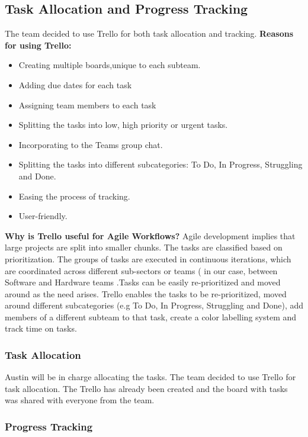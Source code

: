 \documentclass{article}
\begin{document}
\subsection{Task Allocation and Progress Tracking}
The team decided to use Trello for both task allocation and tracking. 
\newline 
\textbf{Reasons for using Trello:}
\begin{itemize}
\item Creating multiple boards,unique to each subteam.
\item Adding due dates for each task
\item Assigning team members to each task
\item Splitting the tasks into low, high priority or urgent tasks.
\item Incorporating to the Teams group chat. 
\item Splitting the tasks into different subcategories: To Do, In Progress, Struggling and Done. 
\item Easing the process of tracking.
\item User-friendly. 
\end{itemize}
\textbf{Why is Trello useful for Agile Workflows? }
\newline
\newline
Agile development implies  that large projects are split into smaller chunks. The tasks are classified based on prioritization. The groups of tasks are executed in continuous iterations, which are coordinated across different sub-sectors or teams ( in our case, between Software and Hardware teams .Tasks can be easily re-prioritized and moved around as the need arises.\cite{HubstaffBlog}
\newline
Trello enables the tasks to be re-prioritized, moved around different subcategories (e.g To Do, In Progress, Struggling and Done), add members of a different subteam to that task, create a color labelling system  and track time on tasks. 

\subsubsection{Task Allocation}

Austin will be in charge allocating the  tasks. The team decided to use Trello for task allocation. The Trello has already been created and the board with tasks was shared with everyone from the team. 

\subsubsection{Progress Tracking}
\end{document}
